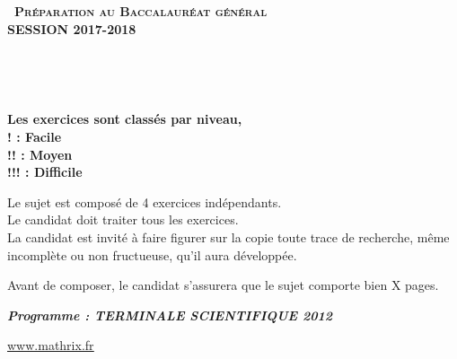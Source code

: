 \documentclass[12pt]{article}
\begin{document}
\setlength\parindent{0mm}

		\renewcommand \footrulewidth{.2pt}
		\pagestyle{fancy}
		\thispagestyle{empty} 

		\begin{center} 
		{\Large{\textbf{\textsc{\decofourleft~Préparation au Baccalauréat général ~\decofourright\\[5pt]
		\vspace{0.3cm}
		SESSION 2017-2018}}}}


		\vspace{1cm}

		\\

		\vspace{1.2cm}

		\\
		\vspace{0.4cm}

		\vspace{0.4cm}
		\textbf{Les exercices sont classés par niveau, \\ 
		! : Facile\\
		!! : Moyen\\
		!!! : Difficile }
		\vspace{1.5cm}

		Le sujet est composé de 4 exercices indépendants.\\
		Le candidat doit traiter tous les exercices.\\
		La candidat est invité à faire figurer sur la copie toute trace de recherche, même incomplète ou 			non fructueuse, qu'il aura développée.

		\vspace{1.5cm}

		Avant de composer, le candidat s'assurera que le sujet comporte bien X pages.

		\vspace{1cm}

		\textbf{\textit{Programme : TERMINALE SCIENTIFIQUE 2012}}
	
		\vspace{2cm}
		\href{http://www.mathrix.fr}{\Large\underline{www.mathrix.fr}}


\newpage
	\end{center}
\end{document}
